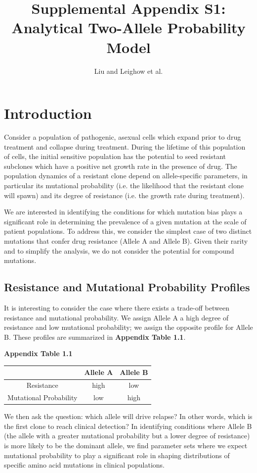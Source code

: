\documentclass{article}
\title{Supplemental Appendix S1: \\
\large Analytical Two-Allele Probability Model}
\author{Liu and Leighow et al.}
\begin{document}
\maketitle


\section{Introduction}

Consider a population of pathogenic, asexual cells which expand prior to drug treatment and collapse during treatment.  During the lifetime of this population of cells, the initial sensitive population has the potential to seed resistant subclones which have a positive net growth rate in the presence of drug.  The population dynamics of a resistant clone depend on allele-specific parameters, in particular its mutational probability (i.e. the likelihood that the resistant clone will spawn) and its degree of resistance (i.e. the growth rate during treatment).

We are interested in identifying the conditions for which mutation bias plays a significant role in determining the prevalence of a given mutation at the scale of patient populations.  To address this, we consider the simplest case of two distinct mutations that confer drug resistance (Allele A and Allele B).  Given their rarity and to simplify the analysis, we do not consider the potential for compound mutations.


\subsection{Resistance and Mutational Probability Profiles}

It is interesting to consider the case where there exists a trade-off between resistance and mutational probability.  We assign Allele A a high degree of resistance and low mutational probability; we assign the opposite profile for Allele B.  These profiles are summarized in \textbf{Appendix Table 1.1}.

\begin{center}
\textbf{Appendix Table 1.1}

 \begin{tabular}{||c | c | c||} 
 \hline
   & Allele A & Allele B \\ [0.5ex] 
 \hline\hline
 Resistance & high & low \\ 
 \hline
 Mutational Probability & low & high \\
 \hline
\end{tabular}
\end{center}
  We then ask the question: which allele will drive relapse?  In other words, which is the first clone to reach clinical detection?  In identifying conditions where Allele B (the allele with a greater mutational probability but a lower degree of resistance) is more likely to be the dominant allele, we find parameter sets where we expect mutational probability to play a significant role in shaping distributions of specific amino acid mutations in clinical populations.
\end{document}
